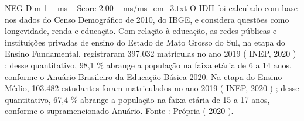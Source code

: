 \begin{textsample}{NEG Dim 1 – ms – Score 2.00 – ms/ms\_em\_3.txt}
O IDH foi calculado com base nos dados do Censo Demográfico de 2010, do IBGE, e considera questões como longevidade, renda e educação.
Com relação à educação, as redes públicas e instituições privadas de ensino do Estado de Mato Grosso do Sul, na etapa do Ensino Fundamental, registraram 397.032 matrículas no ano 2019 ( INEP, 2020 ) ; desse quantitativo, 98,1 \% abrange a população na faixa etária de 6 a 14 anos, conforme o Anuário Brasileiro da Educação Básica 2020.
Na etapa do Ensino Médio, 103.482 estudantes foram matriculados no ano 2019 ( INEP, 2020 ) ; desse quantitativo, 67,4 \% abrange a população na faixa etária de 15 a 17 anos, conforme o supramencionado Anuário.
Fonte : Própria ( 2020 ).

\end{textsample}
